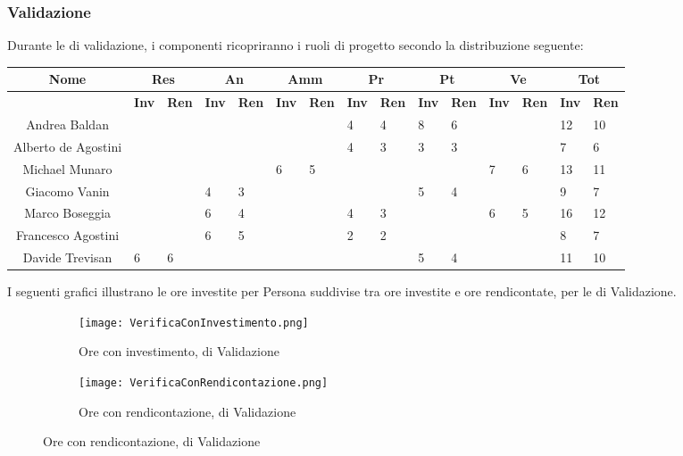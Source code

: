\documentclass{scalatekids-article}
\begin{document}
\subsubsection{Validazione}
Durante le  di validazione, i componenti ricopriranno i ruoli di progetto secondo la distribuzione seguente:
\begin{center}
  \scriptsize
  \begin{tabular}{| c | p{0.35cm}  p{0.35cm} | p{0.35cm}  p{0.35cm} | p{0.35cm}  p{0.35cm} | p{0.35cm}  p{0.35cm} | p{0.35cm}  p{0.35cm} | p{0.35cm}  p{0.35cm} | p{0.35cm}  p{0.35cm} |}
    \hline
    \textbf{Nome} & \multicolumn{2}{|c|}{\textbf{Res}} & \multicolumn{2}{|c|}{\textbf{An}} & \multicolumn{2}{|c|}{\textbf{Amm}} & \multicolumn{2}{|c|}{\textbf{Pr}} & \multicolumn{2}{|c|}{\textbf{Pt}} & \multicolumn{2}{|c|}{\textbf{Ve}} & \multicolumn{2}{|c|}{\textbf{Tot}}\\

    \hline
    & \textbf{Inv} & \textbf{Ren} & \textbf{Inv} & \textbf{Ren} & \textbf{Inv} & \textbf{Ren} & \textbf{Inv} & \textbf{Ren} & \textbf{Inv} & \textbf{Ren} & \textbf{Inv} & \textbf{Ren} & \textbf{Inv} & \textbf{Ren}\\
    \hline
    Andrea Baldan & & & & & & & 4 & 4 & 8 & 6 & & & 12 & 10\\
    Alberto de Agostini & & & & & & & 4 & 3 & 3 & 3 & & & 7 & 6\\
    Michael Munaro & & & & & 6 & 5 & & & & & 7 & 6 & 13 & 11\\
    Giacomo Vanin & & & 4 & 3 & & & & & 5 & 4 & & & 9 & 7\\
    Marco Boseggia & & & 6 & 4 & & & 4 & 3 & & & 6 & 5 & 16 & 12\\
    Francesco Agostini & & & 6 & 5 & & & 2 & 2 & & & & & 8 & 7\\
    Davide Trevisan & 6 & 6 & & & & & & & 5 & 4 & & & 11 & 10\\
    \hline
  \end{tabular}
\end{center}
\normalsize I seguenti grafici illustrano le ore investite per Persona suddivise
tra ore investite e ore rendicontate, per le  di Validazione.
\begin{figure}[H]
  \begin{subfigure}[H]{0.47\textwidth}
    \texttt{[image: VerificaConInvestimento.png]}
    \caption{Ore con investimento,  di Validazione}
  \end{subfigure}
  \qquad
  \begin{subfigure}[H]{0.47\textwidth}
    \texttt{[image: VerificaConRendicontazione.png]}
    \caption{Ore con rendicontazione,  di Validazione}
  \end{subfigure}
\end{figure}
\end{document}
